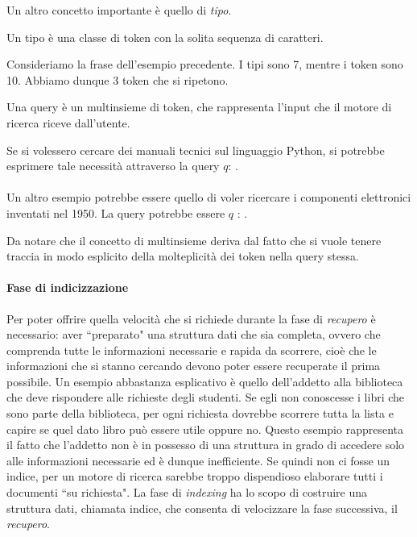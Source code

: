 Un altro concetto importante è quello di \textit{tipo}.

\begin{definizione}[tipo]\label{def:tipo}
	Un tipo è una classe di token con la solita sequenza di caratteri.
\end{definizione}
\begin{esempio}
	Consideriamo la frase dell'esempio precedente. I tipi sono 7, mentre i token sono 10. Abbiamo dunque
	3 token che si ripetono.
\end{esempio}
\begin{definizione}[query]\label{def:query}
	Una query è un multinsieme di token, che rappresenta l'input che il motore di ricerca
	riceve dall'utente. 
\end{definizione}

\begin{esempio}
	Se si volessero cercare dei manuali tecnici sul linguaggio Python, si potrebbe esprimere 
	tale necessità attraverso la query $q$:  .
	\\
	\\
	Un altro esempio potrebbe essere quello di voler ricercare i componenti
	elettronici inventati nel 1950. La query potrebbe essere $q$ : 
	 .
\end{esempio}

Da notare che il concetto di multinsieme deriva dal fatto che si vuole tenere traccia in modo esplicito 
della molteplicità dei token nella query stessa.

\paragraph{Fase di indicizzazione}
Per poter offrire quella velocità che si richiede durante la fase di \textit{recupero} è necessario: aver ``preparato"
una struttura dati che sia completa, ovvero che comprenda tutte le informazioni necessarie e 
rapida da scorrere, cioè che le informazioni che si stanno cercando devono poter essere recuperate
il prima possibile.  Un esempio abbastanza esplicativo è quello dell'addetto alla biblioteca che deve rispondere
alle richieste degli studenti. Se egli non conoscesse i libri che sono parte della biblioteca, per ogni richiesta
dovrebbe scorrere tutta la lista e capire se quel dato libro può essere utile oppure no.
Questo esempio rappresenta il fatto che l'addetto non è in possesso di una struttura in grado
di accedere solo alle informazioni necessarie ed è dunque inefficiente.
Se quindi non ci fosse un indice, per un motore di ricerca sarebbe troppo dispendioso elaborare tutti
i documenti ``su richiesta".
La fase di \textit{indexing} ha lo scopo di costruire una struttura dati, chiamata indice, che consenta
di velocizzare la fase successiva, il \textit{recupero}.

